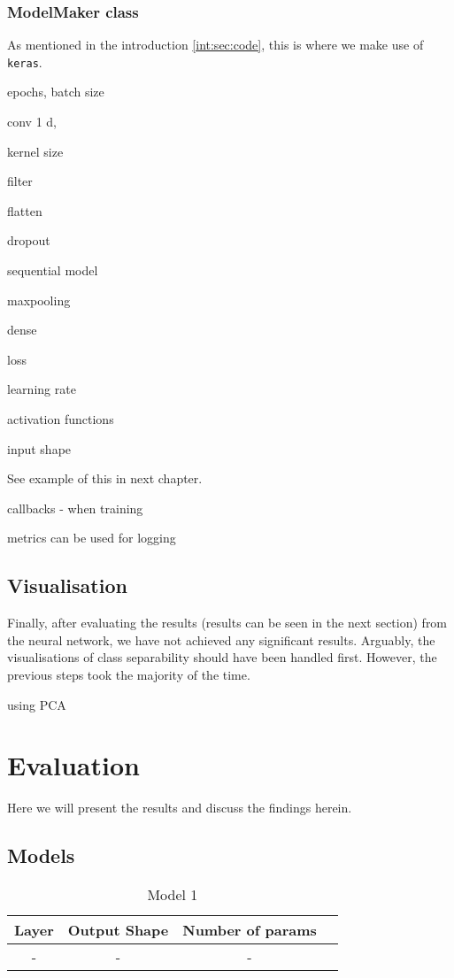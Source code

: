 \subsection{ModelMaker class}
As mentioned in the introduction \ref{int:sec:code}, this is where we make use of \verb|keras|.

epochs, batch size

conv 1 d,

kernel size

filter

flatten

dropout

sequential model

maxpooling

dense

loss

learning rate

activation functions

input shape

See example of this in next chapter. 

callbacks - when training

metrics can be used for logging
\section{Visualisation}
Finally, after evaluating the results (results can be seen in the next section) from the neural network, we have not achieved any significant results. Arguably, the visualisations of class separability should have been handled first. However, the previous steps took the majority of the time.


using PCA

\chapter{Evaluation}
Here we will present the results and discuss the findings herein.


\section{Models}
\begin{table}[H]
	\centering
	\begin{tabular}{|c|c|c| c|} \hline
		\textbf{Layer} & \textbf{Output Shape } & \textbf{Number of params} \\ \hline \hline 
		- & - &  -  \\ \hline 
	\end{tabular}
	\caption{Model 1}
	\label{datasets}
\end{table}

